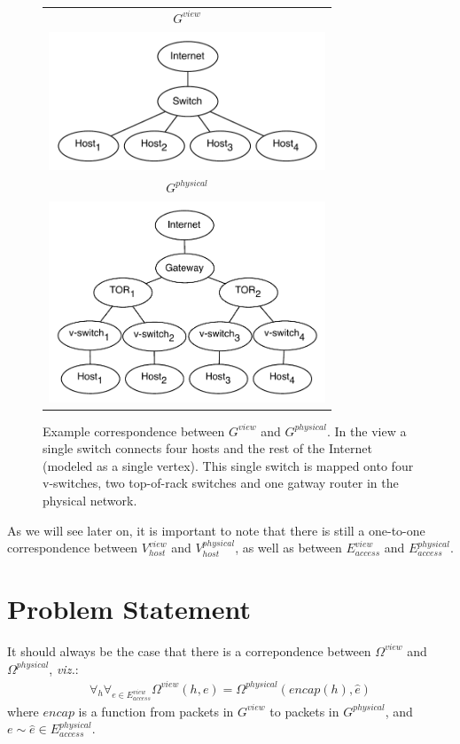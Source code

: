 \documentclass{sig-alternate-10pt}
\begin{document}
\begin{figure}[t]
\hspace{-10pt}
\begin{tabular}{c}
    $G^{view}$ \\
    \includegraphics[width=3.25in]{../diagrams/necula_views/app_view.pdf}  \\
    $G^{physical}$ \\
    \includegraphics[width=3.25in]{../diagrams/necula_views/physical_view.pdf}
\end{tabular}
\caption[]{\label{fig:view_and_physical} Example correspondence between
$G^{view}$ and $G^{physical}$. In the view a single switch connects 
four hosts and the rest of the Internet (modeled as a single vertex).
This single switch is mapped onto four v-switches, two top-of-rack switches 
and one gatway router in the physical network.}
\end{figure}

As we will see later on, it is important to note that there is still a one-to-one correspondence
between $V_{host}^{view}$ and $V_{host}^{physical}$, as well as between
$E_{access}^{view}$ and $E_{access}^{physical}$.

\section{Problem Statement}

It should always be the case that there is a correpondence between
$\Omega^{view}$ and $\Omega^{physical}$, {\it viz.}:
\begin{align*}
\forall_{h} \forall_{e \in E_{access}^{view}} \Omega^{view}(h,e) =
\Omega^{physical}(encap(h),\hat{e}) 
\end{align*}
where $encap$ is a function from packets in $G^{view}$ to packets in
$G^{physical}$, and $e \sim \hat{e} \in E_{access}^{physical}$.
\end{document}

